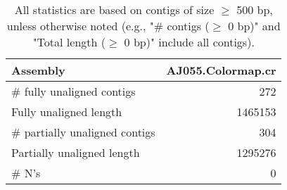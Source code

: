 \documentclass[12pt,a4paper]{article}
\begin{document}
\begin{table}[ht]
\begin{center}
\caption{All statistics are based on contigs of size $\geq$ 500 bp, unless otherwise noted (e.g., "\# contigs ($\geq$ 0 bp)" and "Total length ($\geq$ 0 bp)" include all contigs).}
\begin{tabular}{|l*{1}{|r}|}
\hline
Assembly & AJ055.Colormap.cr \\ \hline
\# fully unaligned contigs & 272 \\ \hline
Fully unaligned length & 1465153 \\ \hline
\# partially unaligned contigs & 304 \\ \hline
Partially unaligned length & 1295276 \\ \hline
\# N's & 0 \\ \hline
\end{tabular}
\end{center}
\end{table}
\end{document}

